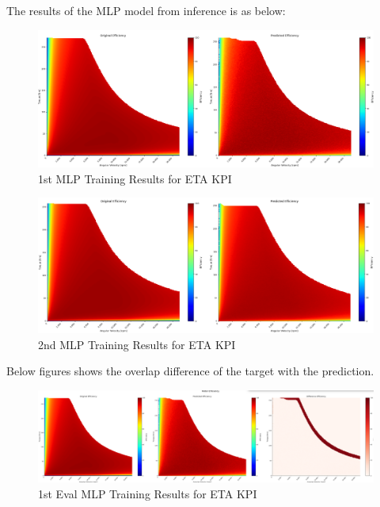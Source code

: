 \documentclass{report} %
\begin{document}
The results of the \ac{MLP} model from inference is as below: \\

\begin{figure}[H]
    \centering
    \includegraphics[width=1\textwidth]{./ReportImages/KPI3Dprediction1.png} 
    \caption{1st MLP Training Results for ETA \ac{KPI}} 
    \label{fig:1st MLP Training Results for 3D KPI(ETA)}
\end{figure}

\begin{figure}[H]
    \centering
    \includegraphics[width=1\textwidth]{./ReportImages/KPI3Dprediction2.png} 
    \caption{2nd MLP Training Results for ETA \ac{KPI}} 
    \label{fig:2nd MLP Training Results for 3D KPI(ETA)}
\end{figure}

Below  figures shows the overlap difference of the target with the prediction. \\

\begin{figure}[H]
    \centering
    \includegraphics[width=1\textwidth]{./ReportImages/evalKPI3Dprediction1.png} 
    \caption{1st Eval MLP Training Results for ETA \ac{KPI}} 
    \label{fig:1st Eval MLP Training Results for 3D KPI(ETA)}
\end{figure}
\end{document}
